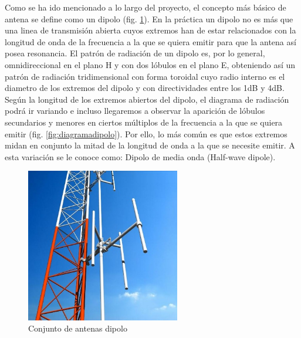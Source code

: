 \par Como se ha ido mencionado a lo largo del proyecto, el concepto más básico de antena se define como un dipolo (fig. \ref{fig:conjuntodipolo}). En la práctica un dipolo no es más que una linea de transmisión abierta cuyos extremos han de estar relacionados con la longitud de onda de la frecuencia a la que se quiera emitir para que la antena así posea resonancia. El patrón de radiación de un dipolo es, por lo general, omnidireccional en el plano H y con dos lóbulos en el plano E, obteniendo así un patrón de radiación tridimensional con forma toroidal cuyo radio interno es el diametro de los extremos del dipolo y con directividades entre los 1dB y 4dB. Según la longitud de los extremos abiertos del dipolo, el diagrama de radiación podrá ir variando e incluso llegaremos a observar la aparición de lóbulos secundarios y menores en ciertos múltiplos de la frecuencia a la que se quiera emitir (fig. \ref{fig:diagramadipolo}). Por ello, lo más común es que estos extremos midan en conjunto la mitad de la longitud de onda a la que se necesite emitir. A esta variación se le conoce como: Dipolo de media onda (Half-wave dipole).
\\
\begin{figure}[h]
    \centering
        \includegraphics[width=0.6\textwidth]{archivos/dipolo/dipoloo}
        \caption{Conjunto de antenas dipolo \cite{Ideal-Antenas2008}}
        \label{fig:conjuntodipolo}
\end{figure}

